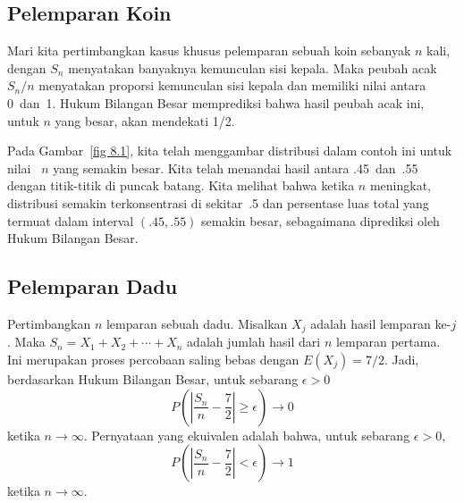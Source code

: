 \subsection*{Pelemparan Koin}
Mari kita pertimbangkan kasus khusus pelemparan sebuah koin sebanyak $n$ kali, dengan $S_n$
menyatakan banyaknya kemunculan sisi kepala.  Maka peubah acak $S_n/n$ menyatakan
proporsi kemunculan sisi kepala dan memiliki nilai antara 0~dan~1.  Hukum
Bilangan Besar memprediksi bahwa hasil peubah acak ini, untuk
$n$ yang besar, akan mendekati 1/2.

Pada Gambar~\ref{fig 8.1}, kita telah menggambar distribusi dalam contoh ini untuk nilai
~$n$ yang semakin besar. Kita telah menandai hasil antara .45~dan~.55 dengan titik-titik di puncak
batang.  Kita melihat bahwa ketika
$n$ meningkat, distribusi semakin terkonsentrasi di sekitar~.5 dan persentase
luas total yang termuat dalam interval $(.45,.55)$ semakin
besar, sebagaimana diprediksi oleh Hukum Bilangan Besar.



\subsection*{Pelemparan Dadu}
\begin{example}
Pertimbangkan $n$ lemparan sebuah dadu.  Misalkan $X_j$ adalah hasil lemparan ke-$j$.  Maka
$S_n = X_1 + X_2 +\cdots+ X_n$ adalah jumlah hasil dari $n$ lemparan pertama.  Ini merupakan
proses percobaan saling bebas dengan $E(X_j) = 7/2$.  Jadi, berdasarkan Hukum Bilangan
Besar, untuk sebarang $\epsilon > 0$
$$
P\left( \left| \frac {S_n}n - \frac 72 \right| \geq \epsilon \right) \to 0
$$
ketika $n \rightarrow \infty$.  Pernyataan yang ekuivalen adalah bahwa, untuk sebarang $\epsilon > 0$,
$$
P\left( \left| \frac {S_n}n - \frac 72 \right| < \epsilon \right) \to 1
$$
ketika $n \rightarrow \infty$.
\end{example}

